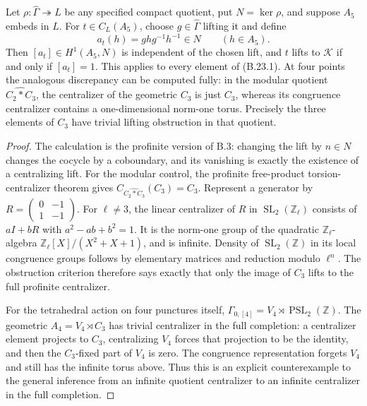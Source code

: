 Let \(\rho:\widehat\Gamma\twoheadrightarrow L\) be any
specified compact quotient, put \(N=\ker\rho\), and suppose
\(A_5\) embeds in \(L\). For \(t\in C_L(A_5)\), choose
\(g\in\widehat\Gamma\) lifting it and define
\[
 a_t(h)=ghg^{-1}h^{-1}\in N\qquad(h\in A_5).
\]
Then \([a_t]\in H^1(A_5,N)\) is independent of the chosen
lift, and \(t\) lifts to \(\mathcal K\) if and only if
\([a_t]=1\). This applies to every element of (B.23.1).
At four points the analogous discrepancy can be computed
fully: in the modular quotient \(\widehat{C_2*C_3}\),
the centralizer of the geometric \(C_3\) is just \(C_3\),
whereas its congruence centralizer contains a one-dimensional
norm-one torus. Precisely the three elements of \(C_3\)
have trivial lifting obstruction in that quotient.
\begin{proof}
The calculation is the profinite version of B.3: changing
the lift by \(n\in N\) changes the cocycle by a
coboundary, and its vanishing is exactly the existence of
a centralizing lift. For the modular control, the profinite
free-product torsion-centralizer theorem gives
\(C_{\widehat{C_2*C_3}}(C_3)=C_3\).
Represent a generator by
\(R=\left(\begin{smallmatrix}0&-1\\1&-1\end{smallmatrix}\right)\).
For \(\ell\ne3\), the linear centralizer of \(R\)
in \(\operatorname{SL}_2(\mathbb Z_\ell)\) consists of
\(aI+bR\) with \(a^2-ab+b^2=1\). It is the norm-one
group of the quadratic \(\mathbb Z_\ell\)-algebra
\(\mathbb Z_\ell[X]/(X^2+X+1)\), and is infinite.
Density of \(\operatorname{SL}_2(\mathbb Z)\) in its local
congruence groups follows by elementary matrices and
reduction modulo \(\ell^n\). The obstruction criterion
therefore says exactly that only the image of \(C_3\)
lifts to the full profinite centralizer.

For the tetrahedral action on four punctures itself,
\(\Gamma_{0,[4]}=V_4\rtimes\operatorname{PSL}_2(\mathbb Z)\).
The geometric \(A_4=V_4\rtimes C_3\) has trivial
centralizer in the full completion: a centralizer element
projects to \(C_3\), centralizing \(V_4\) forces that
projection to be the identity, and then the \(C_3\)-fixed
part of \(V_4\) is zero. The congruence representation
forgets \(V_4\) and still has the infinite torus above.
Thus this is an explicit counterexample to the general
inference from an infinite quotient centralizer to an
infinite centralizer in the full completion.
\end{proof}


